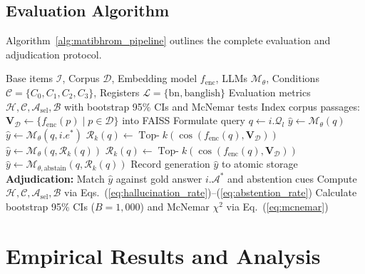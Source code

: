 \documentclass[11pt,a4paper,twocolumn]{article}
\begin{document}
\subsection{Evaluation Algorithm}
Algorithm~\ref{alg:matibhrom_pipeline} outlines the complete evaluation and adjudication protocol.

\begin{algorithm}[t]
\caption{Matibhrom Multi-Condition Evaluation Protocol}
\label{alg:matibhrom_pipeline}
\begin{algorithmic}[1]
\Require Base items $\mathcal{I}$, Corpus $\mathcal{D}$, Embedding model $f_{\text{enc}}$, LLMs $\mathcal{M}_\theta$, Conditions $\mathcal{C} = \{C_0, C_1, C_2, C_3\}$, Registers $\mathcal{L} = \{\text{bn}, \text{banglish}\}$
\Ensure Evaluation metrics $\mathcal{H}, \mathcal{C}, \mathcal{A}_{\text{sel}}, \mathcal{B}$ with bootstrap 95\% CIs and McNemar tests
\State Index corpus passages: $\mathbf{V}_{\mathcal{D}} \leftarrow \{f_{\text{enc}}(p) \mid p \in \mathcal{D}\}$ into FAISS
        \State Formulate query $q \leftarrow i.\mathcal{Q}_l$
            \State $\hat{y} \leftarrow \mathcal{M}_\theta(q)$
            \State $\hat{y} \leftarrow \mathcal{M}_\theta(q, i.e^*)$
            \State $\mathcal{R}_k(q) \leftarrow \operatorname{Top-}k(\cos(f_{\text{enc}}(q), \mathbf{V}_{\mathcal{D}}))$
            \State $\hat{y} \leftarrow \mathcal{M}_\theta(q, \mathcal{R}_k(q))$
            \State $\mathcal{R}_k(q) \leftarrow \operatorname{Top-}k(\cos(f_{\text{enc}}(q), \mathbf{V}_{\mathcal{D}}))$
            \State $\hat{y} \leftarrow \mathcal{M}_{\theta, \text{abstain}}(q, \mathcal{R}_k(q))$
        \EndIf
        \State Record generation $\hat{y}$ to atomic storage
    \EndFor
\EndFor
\State \textbf{Adjudication:} Match $\hat{y}$ against gold answer $i.\mathcal{A}^*$ and abstention cues
\State Compute $\mathcal{H}, \mathcal{C}, \mathcal{A}_{\text{sel}}, \mathcal{B}$ via Eqs.~(\ref{eq:hallucination_rate})--(\ref{eq:abstention_rate})
\State Calculate bootstrap 95\% CIs ($B=1,000$) and McNemar $\chi^2$ via Eq.~(\ref{eq:mcnemar})
\end{algorithmic}
\end{algorithm}

\section{Empirical Results and Analysis}
\label{sec:results}
\end{document}
